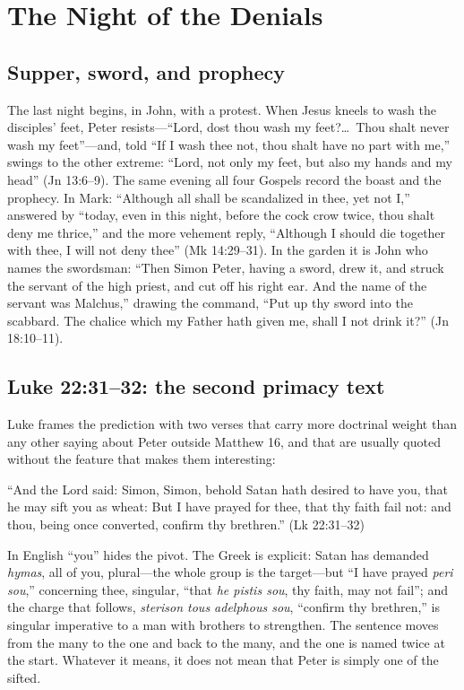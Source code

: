 \section{The Night of the Denials}

\subsection{Supper, sword, and prophecy}

The last night begins, in John, with a protest. When Jesus kneels to wash
the disciples' feet, Peter resists---``Lord, dost thou wash my feet?\ldots\
Thou shalt never wash my feet''---and, told ``If I wash thee not, thou shalt
have no part with me,'' swings to the other extreme: ``Lord, not only my
feet, but also my hands and my head'' (Jn 13:6--9). The same evening all
four Gospels record the boast and the prophecy. In Mark: ``Although all
shall be scandalized in thee, yet not I,'' answered by ``today, even in this
night, before the cock crow twice, thou shalt deny me thrice,'' and the
more vehement reply, ``Although I should die together with thee, I will not
deny thee'' (Mk 14:29--31). In the garden it is John who names the swordsman:
``Then Simon Peter, having a sword, drew it, and struck the servant of the
high priest, and cut off his right ear. And the name of the servant was
Malchus,'' drawing the command, ``Put up thy sword into the scabbard. The
chalice which my Father hath given me, shall I not drink it?''
(Jn 18:10--11).

\subsection{Luke 22:31--32: the second primacy text}

Luke frames the prediction with two verses that carry more doctrinal weight
than any other saying about Peter outside Matthew 16, and that are usually
quoted without the feature that makes them interesting:

\begin{studyframe}\small
``And the Lord said: Simon, Simon, behold Satan hath desired to have you,
that he may sift you as wheat: But I have prayed for thee, that thy faith
fail not: and thou, being once converted, confirm thy brethren.''
(Lk 22:31--32)
\end{studyframe}

In English ``you'' hides the pivot. The Greek is explicit: Satan has demanded
\textit{hymas}, all of you, plural---the whole group is the target---but ``I
have prayed \textit{peri sou},'' concerning thee, singular, ``that
\textit{he pistis sou}, thy faith, may not fail''; and the charge that
follows, \textit{sterison tous adelphous sou}, ``confirm thy brethren,'' is
singular imperative to a man with brothers to strengthen. The sentence moves
from the many to the one and back to the many, and the one is named twice at
the start. Whatever it means, it does not mean that Peter is simply one of
the sifted.

